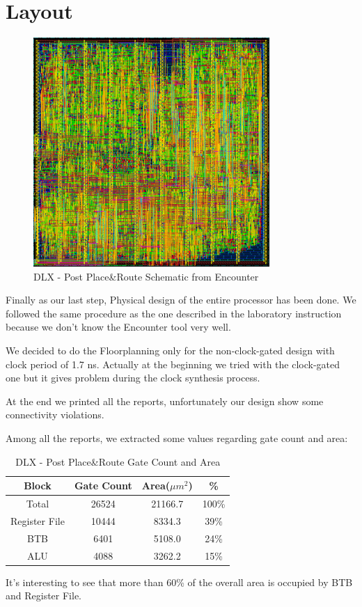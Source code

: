 \documentclass[12pt]{article}
\begin{document}
\section{Layout}\label{Layout}
\begin{figure}[!ht]
	\includegraphics[width=0.8\textwidth, center]{images/dlx-floorplan.jpg}
	\caption{DLX - Post Place\&Route Schematic from Encounter}
	\label{FLORPLANR}
\end{figure}
Finally as our last step, Physical design of the entire processor has been done. We followed the same procedure as the one described in the laboratory instruction because we don't know the Encounter tool very well.

We decided to do the Floorplanning only for the non-clock-gated design with clock period of 1.7 ns.
Actually at the beginning we tried with the clock-gated one but it gives problem during the clock synthesis process.

At the end we printed all the reports, unfortunately our design show some connectivity violations.

Among all the reports, we extracted some values regarding gate count and area:
\begin{table}
\begin{center}
	\begin{tabular}{ | c | c | c | c |}
		\hline
		\rowcolor{LimeGreen}   Block & Gate Count & Area($\mu m^2$)& \%\\ \hline
		Total & 26524 & 21166.7 & 100\% \\ \hline
		Register File & 10444 & 8334.3 & 39\% \\ \hline
		BTB & 6401 &  5108.0 & 24\% \\ \hline
		ALU & 4088 & 3262.2 & 15\% \\ \hline
	\end{tabular}
	\caption{DLX - Post Place\&Route Gate Count and Area}
	\label{AREA}
\end{center}
\end{table}
It's interesting to see that more than 60\% of the overall area is occupied by BTB and Register File.
\end{document}
